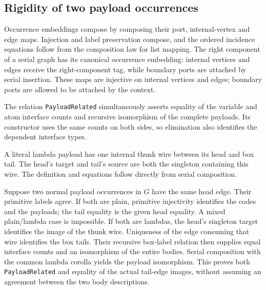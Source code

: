 

\subsection{Rigidity of two payload occurrences}

Occurrence embeddings compose by composing their port, internal-vertex and
edge maps. Injection and label preservation compose, and the ordered incidence
equations follow from the composition law for list mapping. The right component
of a serial graph has its canonical occurrence embedding: internal vertices
and edges receive the right-component tag, while boundary ports are attached
by serial insertion. These maps are injective on internal vertices and edges;
boundary ports are allowed to be attached by the context.



The relation \texttt{PayloadRelated} simultaneously asserts equality of the
variable and atom interface counts and recursive isomorphism of the complete
payloads. Its constructor uses the same counts on both sides, so elimination
also identifies the dependent interface types.


A literal lambda payload has one internal thunk wire between its head and box
tail. The head's target and tail's source are both the singleton containing
this wire. The definition and equations follow directly from serial composition.




Suppose two normal payload occurrences in $G$ have the same head edge.
Their primitive labels agree. If both are plain, primitive injectivity identifies
the codes and the payloads; the tail equality is the given head equality.
A mixed plain/lambda case is impossible. If both are lambdas, the head's
singleton target identifies the image of the thunk wire. Uniqueness of the
edge consuming that wire identifies the box tails. Their recursive box-label
relation then supplies equal interface counts and an isomorphism of the entire
bodies. Serial composition with the common lambda corolla yields the payload
isomorphism. This proves both \texttt{PayloadRelated} and equality of the actual
tail-edge images, without assuming an agreement between the two body descriptions.

